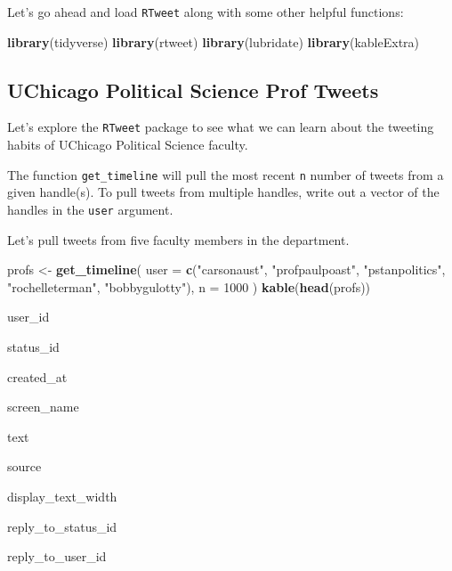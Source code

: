 \documentclass[]{book}
\newenvironment{Shaded}{\begin{snugshade}}{\end{snugshade}}
\newcommand{\KeywordTok}[1]{\textcolor[rgb]{0.13,0.29,0.53}{\textbf{#1}}}
\newcommand{\DataTypeTok}[1]{\textcolor[rgb]{0.13,0.29,0.53}{#1}}
\newcommand{\DecValTok}[1]{\textcolor[rgb]{0.00,0.00,0.81}{#1}}
\newcommand{\StringTok}[1]{\textcolor[rgb]{0.31,0.60,0.02}{#1}}
\newcommand{\NormalTok}[1]{#1}
\begin{document}
Let's go ahead and load \texttt{RTweet} along with some other helpful
functions:

\begin{Shaded}
\begin{Highlighting}[]
\KeywordTok{library}\NormalTok{(tidyverse)}
\KeywordTok{library}\NormalTok{(rtweet)}
\KeywordTok{library}\NormalTok{(lubridate)}
\KeywordTok{library}\NormalTok{(kableExtra)}
\end{Highlighting}
\end{Shaded}

\subsection{UChicago Political Science Prof
Tweets}\label{uchicago-political-science-prof-tweets}

Let's explore the \texttt{RTweet} package to see what we can learn about
the tweeting habits of UChicago Political Science faculty.

The function \texttt{get\_timeline} will pull the most recent \texttt{n}
number of tweets from a given handle(s). To pull tweets from multiple
handles, write out a vector of the handles in the \texttt{user}
argument.

Let's pull tweets from five faculty members in the department.

\begin{Shaded}
\begin{Highlighting}[]
\NormalTok{profs <-}\StringTok{ }\KeywordTok{get_timeline}\NormalTok{(}
  \DataTypeTok{user =} \KeywordTok{c}\NormalTok{(}\StringTok{"carsonaust"}\NormalTok{, }\StringTok{"profpaulpoast"}\NormalTok{, }\StringTok{"pstanpolitics"}\NormalTok{, }\StringTok{"rochelleterman"}\NormalTok{, }\StringTok{"bobbygulotty"}\NormalTok{),}
  \DataTypeTok{n =} \DecValTok{1000}
\NormalTok{)}
\KeywordTok{kable}\NormalTok{(}\KeywordTok{head}\NormalTok{(profs))}
\end{Highlighting}
\end{Shaded}

user\_id

status\_id

created\_at

screen\_name

text

source

display\_text\_width

reply\_to\_status\_id

reply\_to\_user\_id
\end{document}

